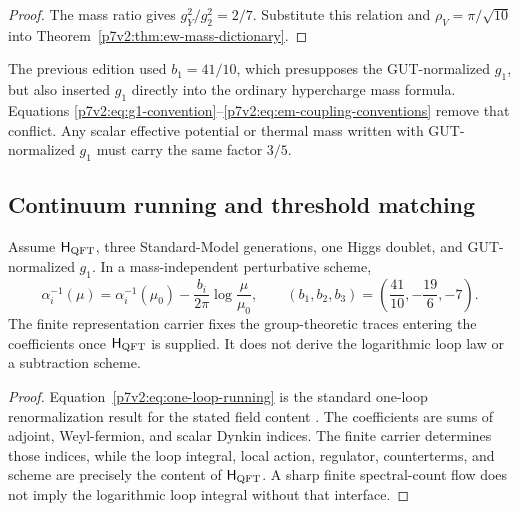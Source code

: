 \documentclass[12pt,a4paper]{article}
\newcommand{\Hqft}{\mathsf{H}_{\rm QFT}}
\begin{document}
\begin{proof}
The mass ratio gives \(g_Y^2/g_2^2=2/7\).  Substitute this relation and
\(\rho_V=\pi/\sqrt{10}\) into
Theorem~\ref{p7v2:thm:ew-mass-dictionary}.
\end{proof}

\begin{remark}
The previous edition used \(b_1=41/10\), which presupposes the
GUT-normalized \(g_1\), but also inserted \(g_1\) directly into the ordinary
hypercharge mass formula.  Equations
\eqref{p7v2:eq:g1-convention}--\eqref{p7v2:eq:em-coupling-conventions} remove
that conflict.  Any scalar effective potential or thermal mass written with
GUT-normalized \(g_1\) must carry the same factor \(3/5\).
\end{remark}

\subsection{Continuum running and threshold matching}
\label{p7v2:sec:running}

\begin{theorem}
\label{p7v2:thm:conditional-one-loop-running}
Assume \(\Hqft\), three Standard-Model generations, one Higgs doublet, and
GUT-normalized \(g_1\).  In a mass-independent perturbative scheme,
\begin{equation}
\label{p7v2:eq:one-loop-running}
 \alpha_i^{-1}(\mu)
 =
 \alpha_i^{-1}(\mu_0)
 -\frac{b_i}{2\pi}\log\frac{\mu}{\mu_0},
 \qquad
 (b_1,b_2,b_3)
 =
 \left(\frac{41}{10},-\frac{19}{6},-7\right).
\end{equation}
The finite representation carrier fixes the group-theoretic traces entering
the coefficients once \(\Hqft\) is supplied.  It does not derive the
logarithmic loop law or a subtraction scheme.
\end{theorem}

\begin{proof}
Equation~\eqref{p7v2:eq:one-loop-running} is the standard one-loop
renormalization result for the stated field content
\cite{MachacekVaughn1984,PDG2024}.  The coefficients are sums of adjoint,
Weyl-fermion, and scalar Dynkin indices.  The finite carrier determines those
indices, while the loop integral, local action, regulator, counterterms, and
scheme are precisely the content of \(\Hqft\).  A sharp finite spectral-count
flow does not imply the logarithmic loop integral without that interface.
\end{proof}
\end{document}

